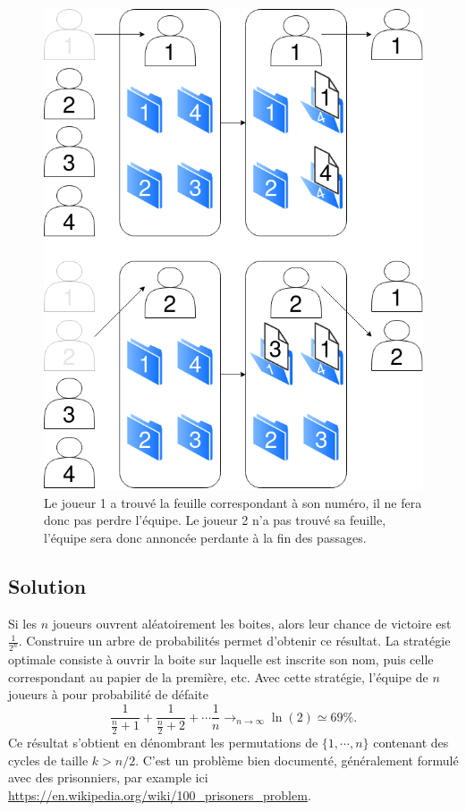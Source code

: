 \documentclass[a4paper,10pt,oneside]{article}
\begin{document}
\begin{figure}[!h]
  \centering
  \includegraphics[height=0.3\textheight]{figures/boites.png}
  \caption{Le joueur 1 a trouvé la feuille correspondant à son numéro, il ne fera donc pas perdre l'équipe. Le joueur 2 n'a pas trouvé sa feuille, l'équipe sera donc annoncée perdante à la fin des passages.}
\end{figure}


\subsection{Solution}

Si les $n$ joueurs ouvrent aléatoirement les boites, alors leur chance de victoire est $\frac{1}{2^n}$. 
Construire un arbre de probabilités permet d'obtenir ce résultat.
La stratégie optimale consiste à ouvrir la boite sur laquelle est inscrite son nom, puis celle correspondant au papier de la première, etc. 
Avec cette stratégie, l'équipe de $n$ joueurs à pour probabilité de défaite
\[
  \frac{1}{\frac{n}{2} +1} + \frac{1}{\frac{n}{2} + 2} + \cdots \frac{1}{n} 
  \rightarrow_{n\rightarrow \infty} \ln(2) \simeq 69\%.
\]
Ce résultat s'obtient en dénombrant les permutations de $\{1,\cdots,n\}$ contenant des cycles de taille $k > n/2$.
C'est un problème bien documenté, généralement formulé avec des prisonniers, par example ici \url{https://en.wikipedia.org/wiki/100_prisoners_problem}.
\end{document}
